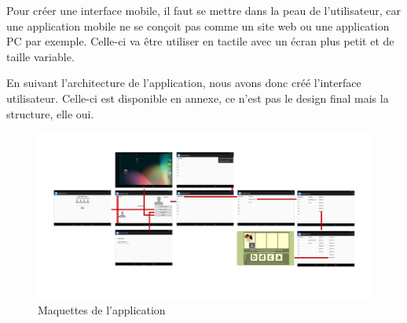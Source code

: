 Pour créer une interface mobile, il faut se mettre dans la peau de l'utilisateur, car une application mobile ne se conçoit pas comme un site web ou une application PC par exemple. Celle-ci va être utiliser en tactile avec un écran plus petit et de taille variable.


En suivant l'architecture de l'application, nous avons donc créé l'interface utilisateur. Celle-ci est disponible en annexe, ce n'est pas le design final mais la structure, elle oui.

\begin{figure}[H]
\begin{center}
\includegraphics[width=15cm]{images/pepit_wireframe}
\end{center}
\caption{Maquettes de l'application}
\label{Maquettes de l'application}
\end{figure}